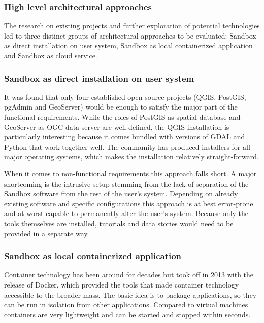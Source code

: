 \documentclass[11pt, a4paper, oneside, parskip=full-]{scrartcl}
\begin{document}
\subsubsection{High level architectural approaches}
The research on existing projects and further exploration of potential
technologies led to three distinct groups of architectural approaches to be
evaluated: Sandbox as direct installation on user system, Sandbox as local
containerized application and Sandbox as cloud service.

\subsubsection*{Sandbox as direct installation on user system}
It was found that only four established open-source projects (QGIS\cite{qgis},
PostGIS\cite{postgis}, pgAdmin\cite{pgadmin} and GeoServer\cite{geoserver})
would be enough to satisfy the major part of the functional requirements. While
the roles of PostGIS as spatial database and GeoServer as OGC data server are
well-defined, the QGIS installation is particularly interesting because it comes
bundled with versions of GDAL and Python that work together well. The community
has produced installers for all major operating systems, which makes the
installation relatively straight-forward.

When it comes to non-functional requirements this approach falls short. A major
shortcoming is the intrusive setup stemming from the lack of separation of the
Sandbox software from the rest of the user's system. Depending on already
existing software and specific configurations this approach is at best
error-prone and at worst capable to permanently alter the user's system. Because
only the tools themselves are installed, tutorials and data stories would need
to be provided in a separate way.

\subsubsection*{Sandbox as local containerized application}
Container technology has been around for decades but took off in 2013 with the
release of Docker, which provided the tools that made container technology
accessible to the broader mass. The basic idea is to package applications, so
they can be run in isolation from other applications. Compared to virtual
machines containers are very lightweight and can be started and stopped within
seconds.
\end{document}
